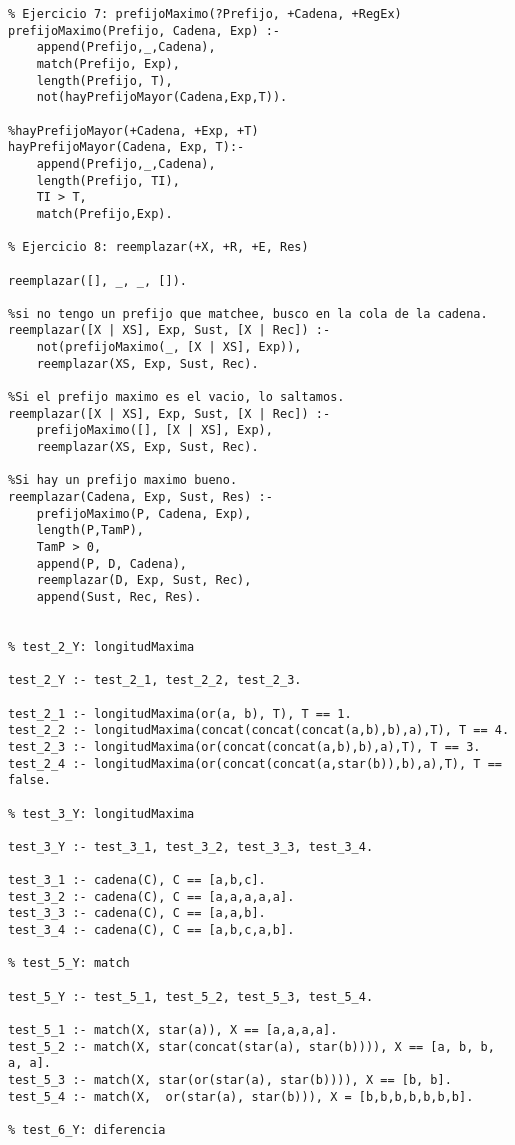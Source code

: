 \begin{verbatim}
% Ejercicio 7: prefijoMaximo(?Prefijo, +Cadena, +RegEx)
prefijoMaximo(Prefijo, Cadena, Exp) :- 
    append(Prefijo,_,Cadena), 
    match(Prefijo, Exp), 
    length(Prefijo, T), 
    not(hayPrefijoMayor(Cadena,Exp,T)).

%hayPrefijoMayor(+Cadena, +Exp, +T)
hayPrefijoMayor(Cadena, Exp, T):- 
    append(Prefijo,_,Cadena), 
    length(Prefijo, TI), 
    TI > T, 
    match(Prefijo,Exp).

% Ejercicio 8: reemplazar(+X, +R, +E, Res)

reemplazar([], _, _, []).

%si no tengo un prefijo que matchee, busco en la cola de la cadena.
reemplazar([X | XS], Exp, Sust, [X | Rec]) :- 
    not(prefijoMaximo(_, [X | XS], Exp)), 
    reemplazar(XS, Exp, Sust, Rec).

%Si el prefijo maximo es el vacio, lo saltamos.
reemplazar([X | XS], Exp, Sust, [X | Rec]) :- 
    prefijoMaximo([], [X | XS], Exp), 
    reemplazar(XS, Exp, Sust, Rec).

%Si hay un prefijo maximo bueno.
reemplazar(Cadena, Exp, Sust, Res) :- 
    prefijoMaximo(P, Cadena, Exp), 
    length(P,TamP), 
    TamP > 0, 
    append(P, D, Cadena), 
    reemplazar(D, Exp, Sust, Rec), 
    append(Sust, Rec, Res).


% test_2_Y: longitudMaxima

test_2_Y :- test_2_1, test_2_2, test_2_3.

test_2_1 :- longitudMaxima(or(a, b), T), T == 1.
test_2_2 :- longitudMaxima(concat(concat(concat(a,b),b),a),T), T == 4.
test_2_3 :- longitudMaxima(or(concat(concat(a,b),b),a),T), T == 3.
test_2_4 :- longitudMaxima(or(concat(concat(a,star(b)),b),a),T), T == false.

% test_3_Y: longitudMaxima

test_3_Y :- test_3_1, test_3_2, test_3_3, test_3_4.

test_3_1 :- cadena(C), C == [a,b,c].
test_3_2 :- cadena(C), C == [a,a,a,a,a].
test_3_3 :- cadena(C), C == [a,a,b].
test_3_4 :- cadena(C), C == [a,b,c,a,b].

% test_5_Y: match

test_5_Y :- test_5_1, test_5_2, test_5_3, test_5_4.

test_5_1 :- match(X, star(a)), X == [a,a,a,a].
test_5_2 :- match(X, star(concat(star(a), star(b)))), X == [a, b, b, a, a].
test_5_3 :- match(X, star(or(star(a), star(b)))), X == [b, b].
test_5_4 :- match(X,  or(star(a), star(b))), X = [b,b,b,b,b,b,b].

% test_6_Y: diferencia


\end{verbatim}
